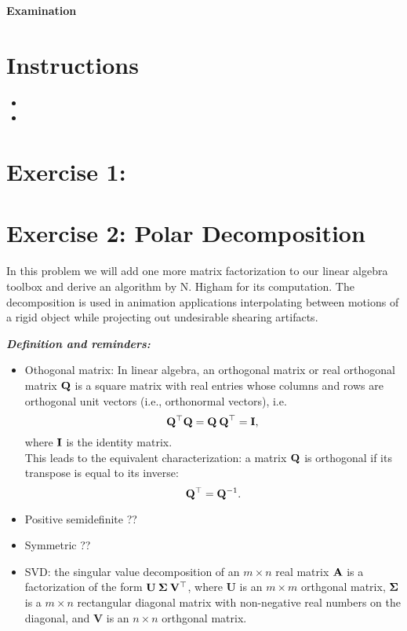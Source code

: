 

\lstset{
  language=Algo,
  basicstyle=\sffamily,
  columns=fullflexible,
  mathescape
}

\begin{center}
{\large\textbf{Examination}}\\
\end{center}

\noindent\makebox[\linewidth]{\rule{\linewidth}{0.6pt}}
 
\section{Instructions}

\begin{itemize}
\item
\item
\end{itemize}



\noindent\makebox[\linewidth]{\rule{\linewidth}{0.6pt}}

\section{Exercise 1: }

\section{Exercise 2: Polar Decomposition}

In this problem we will add one more matrix factorization to our linear algebra toolbox and derive an algorithm by N. Higham for its computation.  The decomposition  is  used  in  animation  applications  interpolating  between  motions  of  a  rigid  object while projecting out undesirable shearing artifacts.

{\it\textbf{Definition and reminders:}
\begin{itemize}
\item Othogonal matrix: In linear algebra, an orthogonal matrix or real orthogonal matrix ${\bf Q}$ is a square matrix with real entries whose columns and rows are orthogonal unit vectors (i.e., orthonormal vectors), i.e.
    $${\bf Q}^\top {\bf Q} = {\bf Q \: Q}^\top = {\bf I},$$
where ${\bf I}$ is the identity matrix.\\
This leads to the equivalent characterization: a matrix ${\bf Q}$ is orthogonal if its transpose is equal to its inverse:
    $${\bf Q}^\top = {\bf Q}^{-1}.$$
\item Positive semidefinite  ??
\item Symmetric ??
\item SVD: the singular value decomposition of an $m \times n$ real matrix ${\bf A}$ is a factorization of the form  ${\bf U \: \Sigma \: V^\top}$, where {\bf U} is an $m \times m$ orthgonal matrix, ${\bf \Sigma}$ is a $m \times n$ rectangular diagonal matrix with non-negative real numbers on the diagonal, and {\bf V} is an $n \times n$ orthgonal matrix.
\end{itemize}
}
